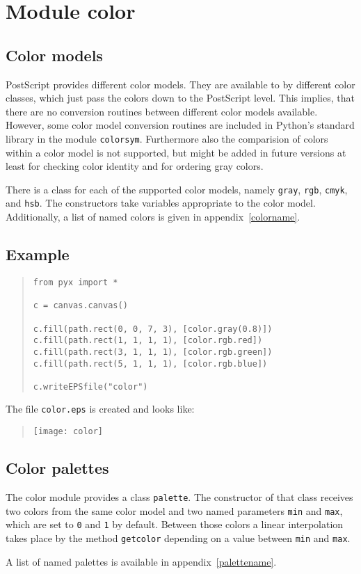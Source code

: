 \chapter{Module color}
\label{color}
\section{Color models}
PostScript provides different color models. They are available to
\PyX{} by different color classes, which just pass the colors down to
the PostScript level. This implies, that there are no conversion
routines between different color models available. However, some color
model conversion routines are included in Python's standard library in
the module \texttt{colorsym}. Furthermore also the comparision of
colors within a color model is not supported, but might be added in
future versions at least for checking color identity and for ordering
gray colors.

There is a class for each of the supported color models, namely
\verb|gray|, \verb|rgb|, \verb|cmyk|, and \verb|hsb|. The constructors
take variables appropriate to the color model. Additionally, a list of
named colors is given in appendix~\ref{colorname}.

\section{Example}
\begin{quote}
\begin{verbatim}
from pyx import *

c = canvas.canvas()

c.fill(path.rect(0, 0, 7, 3), [color.gray(0.8)])
c.fill(path.rect(1, 1, 1, 1), [color.rgb.red])
c.fill(path.rect(3, 1, 1, 1), [color.rgb.green])
c.fill(path.rect(5, 1, 1, 1), [color.rgb.blue])

c.writeEPSfile("color")
\end{verbatim}
\end{quote}

The file \verb|color.eps| is created and looks like:
\begin{quote}
\texttt{[image: color]}
\end{quote}

\section{Color palettes}

The color module provides a class \verb|palette|. The constructor of
that class receives two colors from the same color model and two
named parameters \verb|min| and \verb|max|, which are set to \verb|0|
and \verb|1| by default. Between those colors a linear interpolation
takes place by the method \verb|getcolor| depending on a value between
\verb|min| and \verb|max|.

A list of named palettes is available in appendix~\ref{palettename}.


